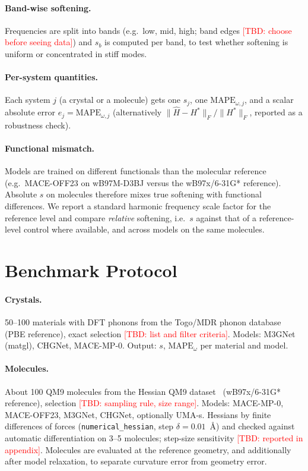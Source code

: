 \documentclass{article}
\newcommand{\TBD}[1]{\textcolor{red}{[TBD: #1]}}
\newcommand{\sfs}{s}      %
\begin{document}
\paragraph{Band-wise softening.} Frequencies are split into bands (e.g.\ low, mid, high; band edges \TBD{choose before seeing data}) and $\sfs_b$ is computed per band, to test whether softening is uniform or concentrated in stiff modes.

\paragraph{Per-system quantities.} Each system $j$ (a crystal or a molecule) gets one $\sfs_j$, one $\mathrm{MAPE}_{\omega,j}$, and a scalar absolute error $e_j=\mathrm{MAPE}_{\omega,j}$ (alternatively $\|\hat H-H^\ast\|_F/\|H^\ast\|_F$, reported as a robustness check).

\paragraph{Functional mismatch.} Models are trained on different functionals than the molecular reference (e.g.\ MACE-OFF23 on wB97M-D3BJ versus the wB97x/6-31G* reference). Absolute $\sfs$ on molecules therefore mixes true softening with functional differences. We report a standard harmonic frequency scale factor for the reference level and compare \emph{relative} softening, i.e.\ $\sfs$ against that of a reference-level control where available, and across models on the same molecules.

\section{Benchmark Protocol}\label{sec:protocol}
\paragraph{Crystals.} 50--100 materials with DFT phonons from the Togo/MDR phonon database (PBE reference), exact selection \TBD{list and filter criteria}. Models: M3GNet (matgl), CHGNet, MACE-MP-0. Output: $\sfs$, $\mathrm{MAPE}_\omega$ per material and model.

\paragraph{Molecules.} About 100 QM9 molecules from the Hessian QM9 dataset~\cite{hessianqm9} (wB97x/6-31G* reference), selection \TBD{sampling rule, size range}. Models: MACE-MP-0, MACE-OFF23, M3GNet, CHGNet, optionally UMA-s. Hessians by finite differences of forces (\texttt{numerical\_hessian}, step $\delta=0.01$~\AA) and checked against automatic differentiation on 3--5 molecules; step-size sensitivity \TBD{reported in appendix}. Molecules are evaluated at the reference geometry, and additionally after model relaxation, to separate curvature error from geometry error.
\end{document}
